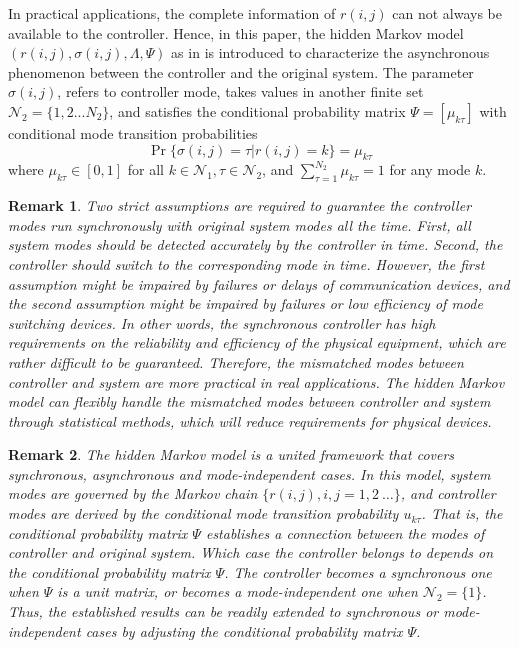 \documentclass[journal,final,twocolumn]{IEEEtran}
\newtheorem{remark}{Remark}
\begin{document}
	In practical applications, the complete information of $r(i,j)$ can not always be available to the controller. Hence, in this paper, the hidden Markov model $(r(i,j),\sigma(i,j),\varLambda,\varPsi)$ as in \cite{wu2016passivity} is introduced to characterize the asynchronous phenomenon between the controller and the original system. The parameter $\sigma(i,j)$, refers to controller mode, takes values in another finite set $\mathcal{N}_{2} = \{1,2...N_{2}\}$, and satisfies the conditional probability matrix $\varPsi=[\mu_{k\tau} ]$ with conditional mode transition probabilities
	\begin{equation}
		\Pr\{\sigma(i,j)=\tau|r(i,j)=k\}=\mu_{k\tau } %
	\end{equation}
	where $\mu_{k\tau }\in[0,1]$ for all $k\in\mathcal{N}_{1}, \tau\in\mathcal{N}_{2}$, and $\sum_{\tau =1}^{N_{2}}\mu_{k\tau } = 1$ for any mode $k$.
	
	\begin{remark}
		Two strict assumptions are required to guarantee the controller modes run synchronously with original system modes all the time. First, all system modes should be detected accurately by the controller in time. Second, the controller should switch to the corresponding mode in time. However, the first assumption might be impaired by  failures or delays of communication devices, and the second assumption might be impaired by failures or low efficiency of mode switching devices. In other words, the synchronous controller has high requirements on the reliability and efficiency of the physical equipment, which are rather difficult to be guaranteed.  Therefore, the mismatched modes between controller and system are more practical in real applications. The hidden Markov model can flexibly handle the mismatched modes between controller and system through statistical methods, which will reduce requirements for physical devices. 
	\end{remark}

 
\begin{remark}
	The hidden Markov model is a united framework that covers synchronous, asynchronous and mode-independent cases.  In this model, system modes are governed by the Markov chain $\{r(i,j), i,j=1,2\ \dots\}$, and controller modes are derived by the conditional mode transition probability $u_{k\tau}$. That is, the conditional probability matrix $\varPsi$ establishes a connection between the modes of controller and original system. Which case the controller belongs to depends on the conditional probability matrix $\varPsi$.  The controller becomes a synchronous one when $\varPsi$ is a unit matrix, or becomes a mode-independent one when $\mathcal{N}_{2}=\{1\}$. Thus, the established results  can be readily extended to synchronous or mode-independent  cases  by adjusting the conditional probability matrix $\varPsi$.
\end{remark}
	
\end{document}
